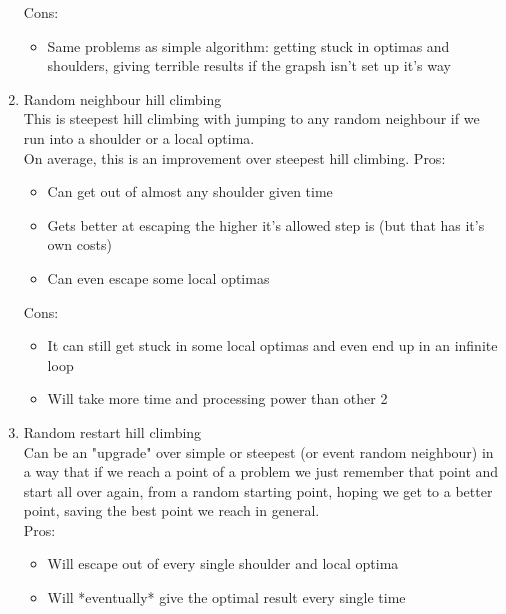 \documentclass[10pt,a4paper]{article}
\begin{document}
\begin{enumerate}
\begin{itemize}
				\end{itemize}
				Cons:
				\begin{itemize}
					\item Same problems as simple algorithm: getting stuck in optimas and shoulders, giving terrible results if the grapsh isn't set up it's way
				\end{itemize}
			\item Random neighbour hill climbing \\
				This is steepest hill climbing with jumping to any random neighbour if we run into a shoulder or a local optima. \\
				On average, this is an improvement over steepest hill climbing.
				Pros:
				\begin{itemize}
                                        \item Can get out of almost any shoulder given time
					\item Gets better at escaping the higher it's allowed step is (but that has it's own costs)
                                        \item Can even escape some local optimas
                                \end{itemize}
                                Cons:
                                \begin{itemize}
                                        \item It can still get stuck in some local optimas and even end up in an infinite loop
                                        \item Will take more time and processing power than other 2
                                \end{itemize}
			\item Random restart hill climbing \\
				Can be an "upgrade" over simple or steepest (or event random neighbour) in a way that if we reach a point of a problem we just remember that point and start all over again, from a random starting point, hoping we get to a better point, saving the best point we reach in general. \\
				Pros:
                                \begin{itemize}
                                        \item Will escape out of every single shoulder and local optima
                                        \item Will *eventually* give the optimal result every single time

\end{itemize}
\end{enumerate}
\end{document}
